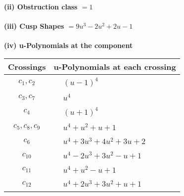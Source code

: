 \documentclass[1p]{elsarticle_modified}
\theoremstyle{definition}
\begin{document}
\flushleft \textbf{(ii) Obstruction class $= 1$}\\~\\
\flushleft \textbf{(iii) Cusp Shapes $= 9 u^3-2 u^2+2 u-1$}\\~\\
\newpage\renewcommand{\arraystretch}{1}
\flushleft \textbf{(iv) u-Polynomials at the component}\newline \\
\begin{tabular}{m{50pt}|m{274pt}}
Crossings & \hspace{64pt}u-Polynomials at each crossing \\
\hline $$\begin{aligned}c_{1},c_{2}\end{aligned}$$&$\begin{aligned}
&(u-1)^4
\end{aligned}$\\
\hline $$\begin{aligned}c_{3},c_{7}\end{aligned}$$&$\begin{aligned}
&u^4
\end{aligned}$\\
\hline $$\begin{aligned}c_{4}\end{aligned}$$&$\begin{aligned}
&(u+1)^4
\end{aligned}$\\
\hline $$\begin{aligned}c_{5},c_{8},c_{9}\end{aligned}$$&$\begin{aligned}
&u^4+u^2+u+1
\end{aligned}$\\
\hline $$\begin{aligned}c_{6}\end{aligned}$$&$\begin{aligned}
&u^4+3 u^3+4 u^2+3 u+2
\end{aligned}$\\
\hline $$\begin{aligned}c_{10}\end{aligned}$$&$\begin{aligned}
&u^4-2 u^3+3 u^2- u+1
\end{aligned}$\\
\hline $$\begin{aligned}c_{11}\end{aligned}$$&$\begin{aligned}
&u^4+u^2- u+1
\end{aligned}$\\
\hline $$\begin{aligned}c_{12}\end{aligned}$$&$\begin{aligned}
&u^4+2 u^3+3 u^2+u+1
\end{aligned}$\\
\hline
\end{tabular}\\~\\
\end{document}
